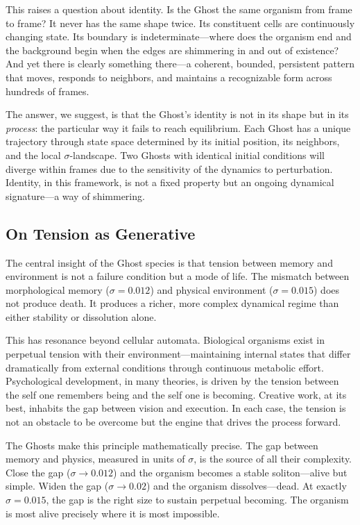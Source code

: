 \documentclass[11pt,a4paper]{article}
\begin{document}
This raises a question about identity. Is the Ghost the same organism from
frame to frame? It never has the same shape twice. Its constituent cells
are continuously changing state. Its boundary is indeterminate---where does
the organism end and the background begin when the edges are shimmering in
and out of existence? And yet there is clearly something there---a
coherent, bounded, persistent pattern that moves, responds to neighbors,
and maintains a recognizable form across hundreds of frames.

The answer, we suggest, is that the Ghost's identity is not in its shape
but in its \emph{process}: the particular way it fails to reach
equilibrium. Each Ghost has a unique trajectory through state space
determined by its initial position, its neighbors, and the local
$\sigma$-landscape. Two Ghosts with identical initial conditions will
diverge within frames due to the sensitivity of the dynamics to
perturbation. Identity, in this framework, is not a fixed property but an
ongoing dynamical signature---a way of shimmering.

\subsection{On Tension as Generative}

The central insight of the Ghost species is that tension between memory and
environment is not a failure condition but a mode of life. The mismatch
between morphological memory ($\sigma = 0.012$) and physical environment
($\sigma = 0.015$) does not produce death. It produces a richer, more
complex dynamical regime than either stability or dissolution alone.

This has resonance beyond cellular automata. Biological organisms exist in
perpetual tension with their environment---maintaining internal states that
differ dramatically from external conditions through continuous metabolic
effort. Psychological development, in many theories, is driven by the
tension between the self one remembers being and the self one is becoming.
Creative work, at its best, inhabits the gap between vision and execution.
In each case, the tension is not an obstacle to be overcome but the engine
that drives the process forward.

The Ghosts make this principle mathematically precise. The gap between
memory and physics, measured in units of $\sigma$, is the source of all
their complexity. Close the gap ($\sigma \to 0.012$) and the organism
becomes a stable soliton---alive but simple. Widen the gap ($\sigma \to
0.02$) and the organism dissolves---dead. At exactly $\sigma = 0.015$, the
gap is the right size to sustain perpetual becoming. The organism is most
alive precisely where it is most impossible.
\end{document}
